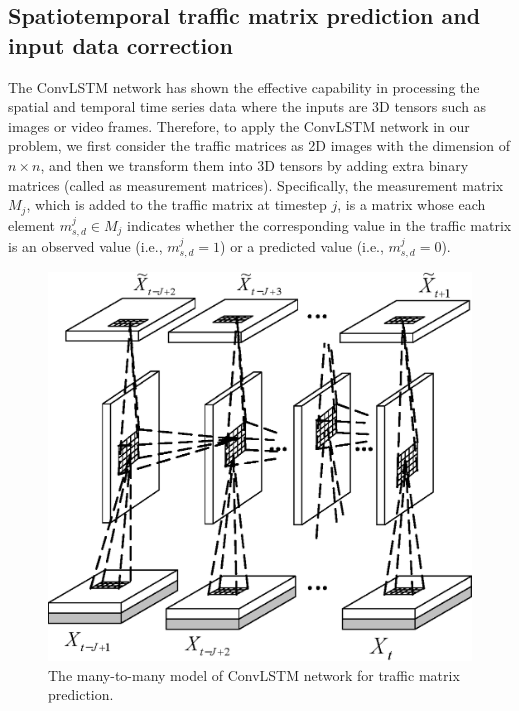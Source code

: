 \subsection{Spatiotemporal traffic matrix prediction and input data correction}
\label{subsection:data_correction}
The ConvLSTM network has shown the effective capability in processing the spatial and temporal time series data where the inputs are 3D tensors such as images or video frames. 
Therefore, to apply the ConvLSTM network in our problem, we first consider the traffic matrices as 2D images with the dimension of $n \times n$, and then we transform them into 3D tensors by adding extra binary matrices (called as measurement matrices). Specifically, the measurement matrix $M_j$, which is added to the traffic matrix at timestep $j$, is a matrix whose each element $m^j_{s,d} \in M_j$ indicates whether the corresponding value in the traffic matrix is an observed value (i.e., $m^j_{s,d}=1$) or a predicted value (i.e., $m^j_{s,d}=0$). 
\begin{figure}
\centering	\includegraphics[width=0.6\columnwidth]{proposed_model_figs/ConvLSTM_TM_prediction.eps}
		\caption{The many-to-many model of ConvLSTM network for traffic matrix prediction. \label{fig:ConvLSTM_TM_prediction}}
        \vspace{-5pt}
\end{figure}
